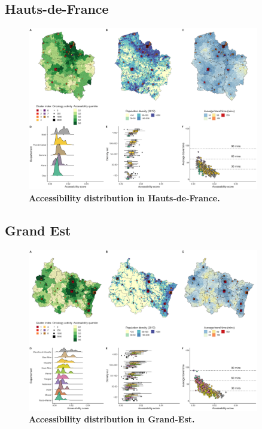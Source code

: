 \subsection*{Hauts-de-France}

\begin{figure}[H]
    \includegraphics[width=0.9\textwidth]{images/camion/region_accessibility/accessibility_Hauts-de-France.png}
    \centering
    \caption{
        \textbf{Accessibility distribution in Hauts-de-France.}
    }
\end{figure}

\subsection*{Grand Est}

\begin{figure}[H]
    \includegraphics[width=0.9\textwidth]{images/camion/region_accessibility/accessibility_Grand-Est.png}
    \centering
    \caption{
        \textbf{Accessibility distribution in Grand-Est.}
    }
\end{figure}

